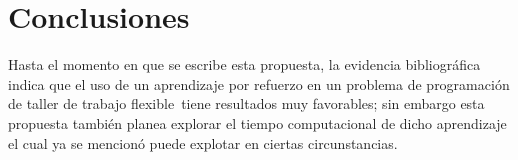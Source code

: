 \documentclass[letterpaper, 10 pt]{article}
\newcommand{\fjsp}{problema de programación de taller de trabajo flexible}
\begin{document}
\section{Conclusiones}
Hasta el momento en que se escribe esta propuesta, la evidencia bibliográfica indica que el uso de un aprendizaje por refuerzo en un \fjsp \, tiene resultados muy favorables; sin embargo esta propuesta también planea explorar el tiempo computacional de dicho aprendizaje el cual ya se mencionó puede explotar en ciertas circunstancias.




\newpage

%
%


\end{document}

